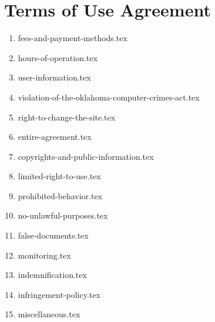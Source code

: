 \section{Terms of Use Agreement}

\begin{enumerate}
    \item {fees-and-payment-methods.tex}
    \item {hours-of-operation.tex}
    \item {user-information.tex}
    \item {violation-of-the-oklahoma-computer-crimes-act.tex}
    \item {right-to-change-the-site.tex}
    \item {entire-agreement.tex}
    \item {copyrights-and-public-information.tex}
    \item {limited-right-to-use.tex}
    \item {prohibited-behavior.tex}
    \item {no-unlawful-purposes.tex}
    \item {false-documents.tex}
    \item {monitoring.tex}
    \item {indemnification.tex}
    \item {infringement-policy.tex}
    \item {miscellaneous.tex}
\end{enumerate}